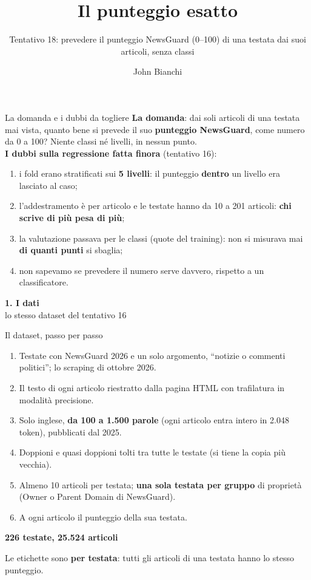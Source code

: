 \documentclass[aspectratio=169]{beamer}
\title[Il punteggio esatto]{Il punteggio esatto}
\subtitle{Tentativo 18: prevedere il punteggio NewsGuard (0--100) di una testata dai suoi articoli, senza classi}
\author[John Bianchi]{John Bianchi}
\institute[]{IMT Lucca \& IIT-CNR Pisa}
\date{}
\newcommand{\hl}[1]{\textbf{#1}}
\newcommand{\divider}[2]{%
  \begin{frame}[plain]
    \vfill
    \begin{center}
      {\color{dividerblue}\Huge\textbf{#1}}\\[0.8em]
      {\large #2}
    \end{center}
    \vfill
  \end{frame}}
\begin{document}
\begin{frame}
  \titlepage
\end{frame}

\begin{frame}{La domanda e i dubbi da togliere}
  \vfill
  \hl{La domanda}: dai soli articoli di una testata mai vista, quanto bene si prevede il suo \hl{punteggio NewsGuard}, come
  numero da 0 a 100? Niente classi n\'e livelli, in nessun punto.\\[1em]
  \hl{I dubbi sulla regressione fatta finora} (tentativo 16):
  \begin{enumerate}
    \setlength\itemsep{0.5em}
    \item i fold erano stratificati sui \hl{5 livelli}: il punteggio \hl{dentro} un livello era lasciato al caso;
    \item l'addestramento \`e per articolo e le testate hanno da 10 a 201 articoli: \hl{chi scrive di pi\`u pesa di pi\`u};
    \item la valutazione passava per le classi (quote del training): non si misurava mai \hl{di quanti punti} si sbaglia;
    \item non sapevamo se prevedere il numero serve davvero, rispetto a un classificatore.
  \end{enumerate}
  \vfill
\end{frame}

\divider{1. I dati}{lo stesso dataset del tentativo 16}

\begin{frame}{Il dataset, passo per passo}
  \vfill
  \small
  \begin{enumerate}
    \setlength\itemsep{0.45em}
    \item Testate con NewsGuard 2026 e un solo argomento, ``notizie o commenti politici''; lo scraping di ottobre 2026.
    \item Il testo di ogni articolo riestratto dalla pagina HTML con trafilatura in modalit\`a precisione.
    \item Solo inglese, \hl{da 100 a 1.500 parole} (ogni articolo entra intero in 2.048 token), pubblicati dal 2025.
    \item Doppioni e quasi doppioni tolti tra tutte le testate (si tiene la copia pi\`u vecchia).
    \item Almeno 10 articoli per testata; \hl{una sola testata per gruppo} di propriet\`a (Owner o Parent Domain di NewsGuard).
    \item A ogni articolo il punteggio della sua testata.
  \end{enumerate}
  \vspace{0.8em}
  \centering
  {\Large \hl{226 testate, 25.524 articoli}}\\[0.3em]
  \raggedright
  Le etichette sono \hl{per testata}: tutti gli articoli di una testata hanno lo stesso punteggio.
  \vfill
\end{frame}
\end{document}
